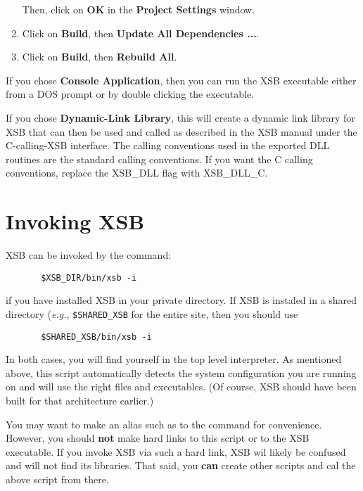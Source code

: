 \begin{enumerate}
\begin{enumerate}
	\end{enumerate}

Then, click on {\bf OK} in the {\bf Project Settings} window.

\item 
   Click on {\bf Build}, then {\bf Update All Dependencies ...}.

\item 
   Click on {\bf Build}, then {\bf Rebuild All}.

\end{enumerate}

If you chose {\bf Console Application}, then you can run the XSB executable
either from a DOS prompt or by double clicking the executable.

If you chose {\bf Dynamic-Link Library}, this will create a dynamic link
library for XSB that can then be used and called as described in the XSB
manual under the C-calling-XSB interface.  The calling conventions used
in the exported DLL routines are the standard calling conventions.  If
you want the C calling conventions, replace the XSB\_DLL flag with
XSB\_DLL\_C.


\section{Invoking XSB}

XSB can be invoked by the command:
\begin{verbatim}
       $XSB_DIR/bin/xsb -i
\end{verbatim}
if you have installed XSB in your private directory.
If XSB is instaled in a shared directory ({\it e.g.}, \verb'$SHARED_XSB'
for the entire site, then you should use
\begin{verbatim}
       $SHARED_XSB/bin/xsb -i
\end{verbatim}
In both cases, you will find yourself in the top level interpreter.  
As mentioned above, this script automatically detects the system
configuration you are running on and will use the right files and
executables. (Of course, XSB should have been built for that architecture
earlier.)

You may want to make an alias such as {\tt \smallourprolog} to the command
for convenience. However, you should {\bf not} make hard links to this
script or to the XSB executable. If you invoke XSB via such a hard link,
XSB wil likely be confused and will not find its libraries.
That said, you {\bf can} create other scripts and cal the above script from
there.  

